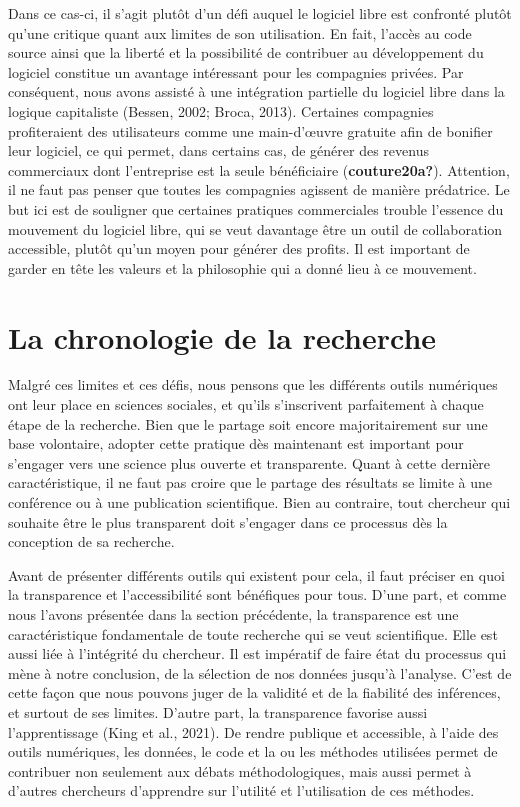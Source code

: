 \documentclass[
  letterpaper,
  DIV=11,
  numbers=noendperiod]{scrreprt}
\begin{document}
Dans ce cas-ci, il s'agit plutôt d'un défi auquel le logiciel libre est
confronté plutôt qu'une critique quant aux limites de son utilisation.
En fait, l'accès au code source ainsi que la liberté et la possibilité
de contribuer au développement du logiciel constitue un avantage
intéressant pour les compagnies privées. Par conséquent, nous avons
assisté à une intégration partielle du logiciel libre dans la logique
capitaliste (Bessen, 2002; Broca, 2013). Certaines compagnies
profiteraient des utilisateurs comme une main-d'œuvre gratuite afin de
bonifier leur logiciel, ce qui permet, dans certains cas, de générer des
revenus commerciaux dont l'entreprise est la seule bénéficiaire
(\textbf{couture20a?}). Attention, il ne faut pas penser que toutes les
compagnies agissent de manière prédatrice. Le but ici est de souligner
que certaines pratiques commerciales trouble l'essence du mouvement du
logiciel libre, qui se veut davantage être un outil de collaboration
accessible, plutôt qu'un moyen pour générer des profits. Il est
important de garder en tête les valeurs et la philosophie qui a donné
lieu à ce mouvement.

\section{La chronologie de la
recherche}\label{la-chronologie-de-la-recherche}

Malgré ces limites et ces défis, nous pensons que les différents outils
numériques ont leur place en sciences sociales, et qu'ils s'inscrivent
parfaitement à chaque étape de la recherche. Bien que le partage soit
encore majoritairement sur une base volontaire, adopter cette pratique
dès maintenant est important pour s'engager vers une science plus
ouverte et transparente. Quant à cette dernière caractéristique, il ne
faut pas croire que le partage des résultats se limite à une conférence
ou à une publication scientifique. Bien au contraire, tout chercheur qui
souhaite être le plus transparent doit s'engager dans ce processus dès
la conception de sa recherche.

Avant de présenter différents outils qui existent pour cela, il faut
préciser en quoi la transparence et l'accessibilité sont bénéfiques pour
tous. D'une part, et comme nous l'avons présentée dans la section
précédente, la transparence est une caractéristique fondamentale de
toute recherche qui se veut scientifique. Elle est aussi liée à
l'intégrité du chercheur. Il est impératif de faire état du processus
qui mène à notre conclusion, de la sélection de nos données jusqu'à
l'analyse. C'est de cette façon que nous pouvons juger de la validité et
de la fiabilité des inférences, et surtout de ses limites. D'autre part,
la transparence favorise aussi l'apprentissage (King et al., 2021). De
rendre publique et accessible, à l'aide des outils numériques, les
données, le code et la ou les méthodes utilisées permet de contribuer
non seulement aux débats méthodologiques, mais aussi permet à d'autres
chercheurs d'apprendre sur l'utilité et l'utilisation de ces méthodes.
\end{document}
